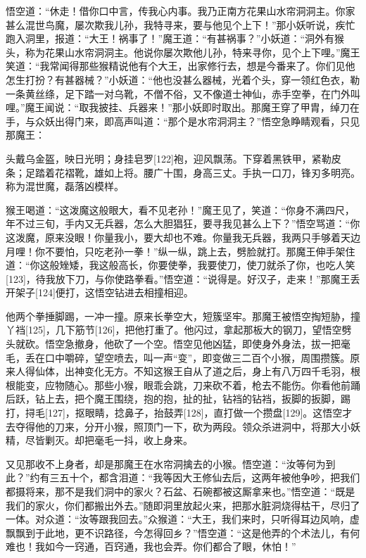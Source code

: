 \documentclass[12pt,UTF8]{ctexbook}
\begin{document}
悟空道：“休走！借你口中言，传我心内事。我乃正南方花果山水帘洞洞主。你家甚么混世鸟魔，屡次欺我儿孙，我特寻来，要与他见个上下！”那小妖听说，疾忙跑入洞里，报道：“大王！祸事了！”魔王道：“有甚祸事？”小妖道：“洞外有猴头，称为花果山水帘洞洞主。他说你屡次欺他儿孙，特来寻你，见个上下哩。”魔王笑道：“我常闻得那些猴精说他有个大王，出家修行去，想是今番来了。你们见他怎生打扮？有甚器械？”小妖道：“他也没甚么器械，光着个头，穿一领红色衣，勒一条黄丝绦，足下踏一对乌靴，不僧不俗，又不像道士神仙，赤手空拳，在门外叫哩。”魔王闻说：“取我披挂、兵器来！”那小妖即时取出。那魔王穿了甲胄，绰刀在手，与众妖出得门来，即高声叫道：“那个是水帘洞洞主？”悟空急睁睛观看，只见那魔王：

头戴乌金盔，映日光明；身挂皂罗[122]袍，迎风飘荡。下穿着黑铁甲，紧勒皮条；足踏着花褶靴，雄如上将。腰广十围，身高三丈。手执一口刀，锋刃多明亮。称为混世魔，磊落凶模样。

猴王喝道：“这泼魔这般眼大，看不见老孙！”魔王见了，笑道：“你身不满四尺，年不过三旬，手内又无兵器，怎么大胆猖狂，要寻我见甚么上下？”悟空骂道：“你这泼魔，原来没眼！你量我小，要大却也不难。你量我无兵器，我两只手够着天边月哩！你不要怕，只吃老孙一拳！”纵一纵，跳上去，劈脸就打。那魔王伸手架住道：“你这般矬矮，我这般高长，你要使拳，我要使刀，使刀就杀了你，也吃人笑[123]，待我放下刀，与你使路拳看。”悟空道：“说得是。好汉子，走来！”那魔王丢开架子[124]便打，这悟空钻进去相撞相迎。

他两个拳捶脚踢，一冲一撞。原来长拳空大，短簇坚牢。那魔王被悟空掏短胁，撞丫裆[125]，几下筋节[126]，把他打重了。他闪过，拿起那板大的钢刀，望悟空劈头就砍。悟空急撤身，他砍了一个空。悟空见他凶猛，即使身外身法，拔一把毫毛，丢在口中嚼碎，望空喷去，叫一声“变”，即变做三二百个小猴，周围攒簇。原来人得仙体，出神变化无方。不知这猴王自从了道之后，身上有八万四千毛羽，根根能变，应物随心。那些小猴，眼乖会跳，刀来砍不着，枪去不能伤。你看他前踊后跃，钻上去，把个魔王围绕，抱的抱，扯的扯，钻裆的钻裆，扳脚的扳脚，踢打，挦毛[127]，抠眼睛，捻鼻子，抬鼓弄[128]，直打做一个攒盘[129]。这悟空才去夺得他的刀来，分开小猴，照顶门一下，砍为两段。领众杀进洞中，将那大小妖精，尽皆剿灭。却把毫毛一抖，收上身来。

又见那收不上身者，却是那魔王在水帘洞擒去的小猴。悟空道：“汝等何为到此？”约有三五十个，都含泪道：“我等因大王修仙去后，这两年被他争吵，把我们都摄将来，那不是我们洞中的家火？石盆、石碗都被这厮拿来也。”悟空道：“既是我们的家火，你们都搬出外去。”随即洞里放起火来，把那水脏洞烧得枯干，尽归了一体。对众道：“汝等跟我回去。”众猴道：“大王，我们来时，只听得耳边风响，虚飘飘到于此地，更不识路径，今怎得回乡？”悟空道：“这是他弄的个术法儿，有何难也！我如今一窍通，百窍通，我也会弄。你们都合了眼，休怕！”
\end{document}
